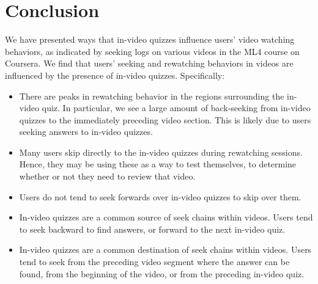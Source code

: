 \documentclass[letterpaper]{article}
\begin{document}
\section{Conclusion}

We have presented ways that in-video quizzes influence users' video watching behaviors, as indicated by seeking logs on various videos in the ML4 course on Coursera. We find that users' seeking and rewatching behaviors in videos are influenced by the presence of in-video quizzes. Specifically:

\begin{itemize}
\item There are peaks in rewatching behavior in the regions surrounding the in-video quiz. In particular, we see a large amount of back-seeking from in-video quizzes to the immediately preceding video section. This is likely due to users seeking answers to in-video quizzes.
\item Many users skip directly to the in-video quizzes during rewatching sessions. Hence, they may be using these as a way to test themselves, to determine whether or not they need to review that video. 
\item Users do not tend to seek forwards over in-video quizzes to skip over them.
\item In-video quizzes are a common source of seek chains within videos. Users tend to seek backward to find answers, or forward to the next in-video quiz.
\item In-video quizzes are a common destination of seek chains within videos. Users tend to seek from the preceding video segment where the answer can be found, from the beginning of the video, or from the preceding in-video quiz.
\end{itemize}



\end{document}
